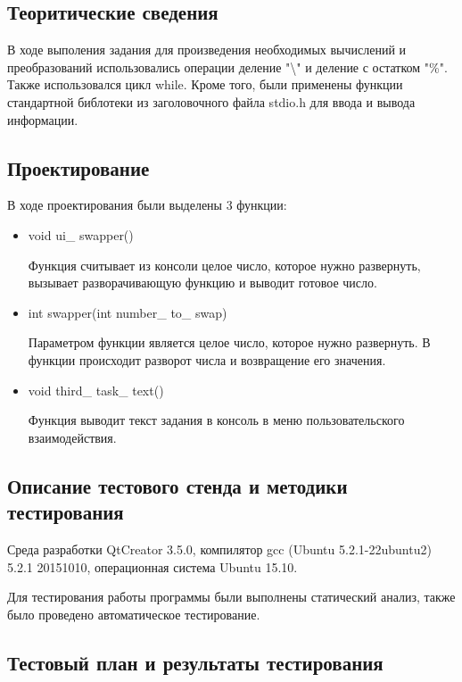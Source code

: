 \documentclass[12pt,a4paper]{report}
\begin{document}
\subsection{Теоритические сведения}

В ходе выполения задания для произведения необходимых вычислений и преобразований использовались операции деление "\textbackslash" и деление с остатком "\%". Также использовался цикл while. Кроме того, были применены функции стандартной библотеки из заголовочного файла stdio.h для ввода и вывода информации.


\subsection{Проектирование}

В ходе проектирования были выделены 3 функции:

\begin{itemize}
	\item void ui\_ swapper()

	Функция считывает из консоли целое число, которое нужно развернуть, вызывает разворачивающую функцию и выводит готовое число.
	
	\item int swapper(int number\_ to\_ swap)
	
	Параметром функции является целое число, которое нужно развернуть.
	В функции происходит разворот числа и возвращение его значения.
	
	\item void third\_ task\_ text()
	
	Функция выводит текст задания в консоль в меню пользовательского взаимодействия.
	
	
\end{itemize}


\subsection{Описание тестового стенда и методики тестирования}

Среда разработки QtCreator 3.5.0, компилятор gcc (Ubuntu 5.2.1-22ubuntu2) 5.2.1 20151010, операционная система Ubuntu 15.10.

Для тестирования работы программы были выполнены статический анализ, также было проведено автоматическое тестирование.

\subsection{Тестовый план и результаты тестирования}
\end{document}
